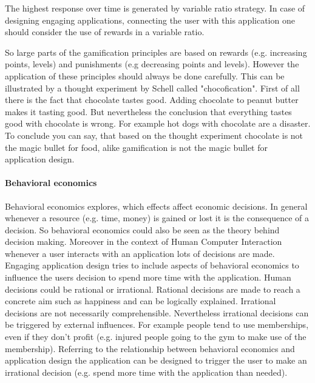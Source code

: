 The highest response over time is generated by variable ratio strategy. In case of designing engaging applications, connecting the user with this application one should consider the use of rewards in a variable ratio. \cite[p. 11]{lewisIrresistibleAppsMotivational2014}

So large parts of the gamification principles are based on rewards (e.g. increasing points, levels) and punishments (e.g decreasing points and levels). However the application of these principles should always be done carefully. This can be illustrated by a thought experiment by Schell called "chocofication". First of all there is the fact that chocolate tastes good. Adding chocolate to peanut butter makes it tasting good. But nevertheless the conclusion that everything tastes good with chocolate is wrong. For example hot dogs with chocolate are a disaster. 
To conclude you can say, that based on the thought experiment chocolate is not the magic bullet for food, alike gamification is not the magic bullet for application design. \cite[p. 12]{lewisIrresistibleAppsMotivational2014}


\paragraph*{Behavioral economics}

Behavioral economics explores, which effects affect economic decisions. In general whenever a resource (e.g. time, money) is gained or lost it is the consequence of a decision. So behavioral economics could also be seen as the theory behind decision making. Moreover in the context of Human Computer Interaction whenever a user interacts with an application lots of decisions are made. Engaging application design tries to include aspects of behavioral economics to influence the users decision to spend more time with the application. 
Human decisions could be rational or irrational. Rational decisions are made to reach a concrete aim such as happiness and can be logically explained. Irrational decisions are not necessarily comprehensible. Nevertheless irrational decisions can be triggered by external influences. For example people tend to use memberships, even if they don't profit (e.g. injured people going to the gym to make use of the membership).
Referring to the relationship between behavioral economics and application design the application can be designed to trigger the user to make an irrational decision (e.g. spend more time with the application than needed). \cite[p. 19]{lewisIrresistibleAppsMotivational2014}


